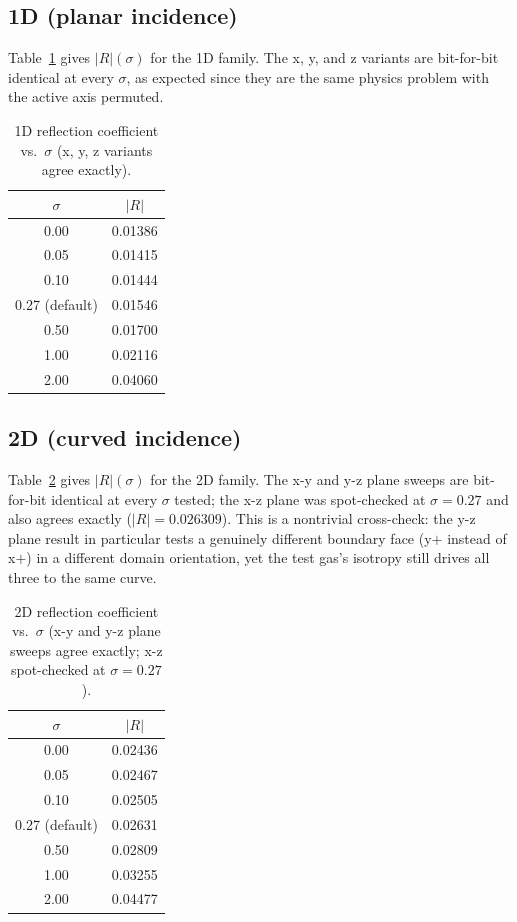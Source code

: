 \documentclass[11pt]{article}
\begin{document}
\subsection{1D (planar incidence)}

Table~\ref{tab:1D} gives $|R|(\sigma)$ for the 1D family. The x, y, and z
variants are bit-for-bit identical at every $\sigma$, as expected since they
are the same physics problem with the active axis permuted.

\begin{table}[h]
\centering
\caption{1D reflection coefficient vs.\ $\sigma$ (x, y, z variants agree
         exactly).}
\label{tab:1D}
\begin{tabular}{@{}cc@{}}
\toprule
$\sigma$ & $|R|$ \\
\midrule
0.00 & 0.01386 \\
0.05 & 0.01415 \\
0.10 & 0.01444 \\
0.27 (default) & 0.01546 \\
0.50 & 0.01700 \\
1.00 & 0.02116 \\
2.00 & 0.04060 \\
\bottomrule
\end{tabular}
\end{table}

\subsection{2D (curved incidence)}

Table~\ref{tab:2D} gives $|R|(\sigma)$ for the 2D family. The x-y and y-z
plane sweeps are bit-for-bit identical at every $\sigma$ tested; the x-z
plane was spot-checked at $\sigma=0.27$ and also agrees exactly
($|R|=0.026309$). This is a nontrivial cross-check: the y-z plane result in
particular tests a genuinely different boundary face (y$+$ instead of x$+$)
in a different domain orientation, yet the test gas's isotropy still drives
all three to the same curve.

\begin{table}[h]
\centering
\caption{2D reflection coefficient vs.\ $\sigma$ (x-y and y-z plane sweeps
         agree exactly; x-z spot-checked at $\sigma=0.27$).}
\label{tab:2D}
\begin{tabular}{@{}cc@{}}
\toprule
$\sigma$ & $|R|$ \\
\midrule
0.00 & 0.02436 \\
0.05 & 0.02467 \\
0.10 & 0.02505 \\
0.27 (default) & 0.02631 \\
0.50 & 0.02809 \\
1.00 & 0.03255 \\
2.00 & 0.04477 \\
\bottomrule
\end{tabular}
\end{table}
\end{document}
